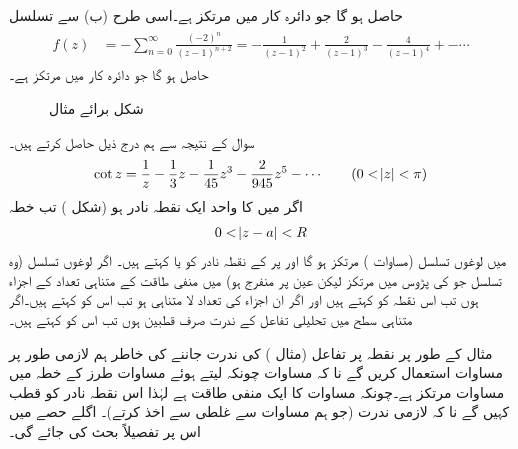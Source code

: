 حاصل ہو گا جو دائرہ کار  میں مرتکز ہے۔اسی طرح (ب) سے تسلسل
\begin{gather}
\begin{aligned}\label{مساوات_ٹیلر_چھلا_دوسرا}
f(z)&=-\sum\limits_{n=0}^{\infty} \frac{(-2)^n}{(z-1)^{n+2}}=-\frac{1}{(z-1)^2}+\frac{2}{(z-1)^3}-\frac{4}{(z-1)^4}+-\cdots
\end{aligned}
\end{gather} 
حاصل ہو گا جو دائرہ کار  میں مرتکز ہے۔
%
\begin{figure}
\centering
{}
\caption{شکل برائے مثال }
\label{شکل_مثال_ٹیلر_لوغوں_مثال_ب}
\end{figure}
\quad 
سوال  کے نتیجہ  سے ہم درج ذیل حاصل کرتے ہیں۔
\begin{align*}
\cot z=\frac{1}{z}-\frac{1}{3}z-\frac{1}{45}z^3-\frac{2}{945}z^5-\cdots\quad \quad (0<\abs{z}<\pi)
\end{align*}
اگر  میں   کا واحد ایک نقطہ نادر  ہو (شکل ) تب خطہ
\begin{align}\label{مساوات_ٹیلر_قطب_خطہ}
0<\abs{z-a}<R
\end{align}
میں لوغوں تسلسل (مساوات ) مرتکز ہو گا اور  پر  کے نقطہ نادر کو  یا  کہتے ہیں۔ اگر لوغوں تسلسل (وہ تسلسل جو  کی پڑوس میں مرتکز لیکن عین  پر منفرج ہو) میں منفی طاقت  کے متناہی  تعداد کے اجزاء ہوں تب اس نقطہ کو  کہتے ہیں اور اگر ان اجزاء کی تعداد لا متناہی ہو تب اس کو  کہتے ہیں۔اگر متناہی سطح میں تحلیلی تفاعل کے ندرت صرف قطبین ہوں تب اس کو  کہتے ہیں۔

مثال کے طور پر نقطہ  پر تفاعل  (مثال ) کی ندرت جاننے کی خاطر ہم لازمی طور پر  مساوات  استعمال کریں گے نا کہ مساوات  چونکہ  لیتے ہوئے مساوات  طرز کے خطہ  میں  مساوات  مرتکز ہے۔چونکہ مساوات  کا ایک منفی طاقت ہے لہٰذا اس نقطہ نادر کو قطب کہیں گے نا کہ لازمی ندرت (جو ہم مساوات  سے غلطی سے اخذ کرتے)۔ اگلے حصے میں اس پر تفصیلاً بحث کی جائے گی۔

